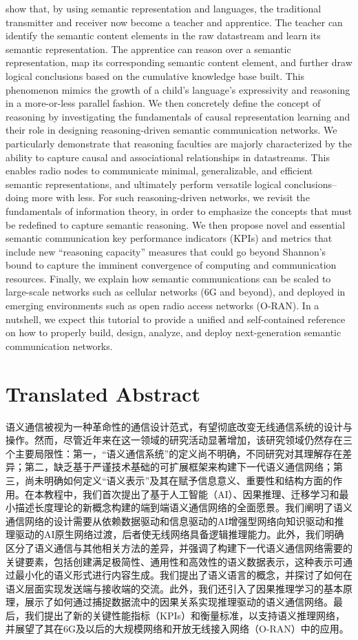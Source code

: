 \documentclass[journal]{IEEEtran}
\begin{document}
show that, by using semantic representation and languages, the traditional transmitter and receiver now become a teacher and apprentice. The teacher can identify the semantic content elements in the raw datastream and learn its semantic representation. The apprentice can reason over a semantic representation, map its corresponding semantic content element, and further draw logical conclusions based on the cumulative knowledge base built. This phenomenon mimics the growth of a child’s language’s expressivity and reasoning in a more-or-less parallel fashion. We then concretely define the concept of reasoning by investigating the fundamentals of causal representation learning and their role in designing reasoning-driven semantic communication networks. We particularly demonstrate that reasoning faculties are majorly characterized by the ability to capture causal and associational relationships in datastreams. This enables radio nodes to communicate minimal, generalizable, and efficient semantic representations, and ultimately perform versatile logical conclusions– doing more with less. For such reasoning-driven networks, we revisit the fundamentals of information theory, in order to emphasize the concepts that must be redefined to capture semantic reasoning. We then propose novel and essential semantic communication key performance indicators (KPIs) and metrics that include new “reasoning capacity” measures that could go beyond Shannon’s bound to capture the imminent convergence of computing and communication resources. Finally, we explain how semantic communications can be scaled to large-scale networks such as cellular networks (6G and beyond), and deployed in emerging environments such as open radio access networks (O-RAN). In a nutshell, we expect this tutorial to provide a unified and self-contained reference on how to properly build, design, analyze, and deploy next-generation semantic communication networks.

\section{Translated Abstract}
语义通信被视为一种革命性的通信设计范式，有望彻底改变无线通信系统的设计与操作。然而，尽管近年来在这一领域的研究活动显著增加，该研究领域仍然存在三个主要局限性：第一，“语义通信系统”的定义尚不明确，不同研究对其理解存在差异；第二，缺乏基于严谨技术基础的可扩展框架来构建下一代语义通信网络；第三，尚未明确如何定义“语义表示”及其在赋予信息意义、重要性和结构方面的作用。在本教程中，我们首次提出了基于人工智能（AI）、因果推理、迁移学习和最小描述长度理论的新概念构建的端到端语义通信网络的全面愿景。我们阐明了语义通信网络的设计需要从依赖数据驱动和信息驱动的AI增强型网络向知识驱动和推理驱动的AI原生网络过渡，后者使无线网络具备逻辑推理能力。此外，我们明确区分了语义通信与其他相关方法的差异，并强调了构建下一代语义通信网络需要的关键要素，包括创建满足极简性、通用性和高效性的语义数据表示，这种表示可通过最小化的语义形式进行内容生成。我们提出了语义语言的概念，并探讨了如何在语义层面实现发送端与接收端的交流。此外，我们还引入了因果推理学习的基本原理，展示了如何通过捕捉数据流中的因果关系实现推理驱动的语义通信网络。最后，我们提出了新的关键性能指标（KPIs）和衡量标准，以支持语义推理网络，并展望了其在6G及以后的大规模网络和开放无线接入网络（O-RAN）中的应用。
\end{document}
